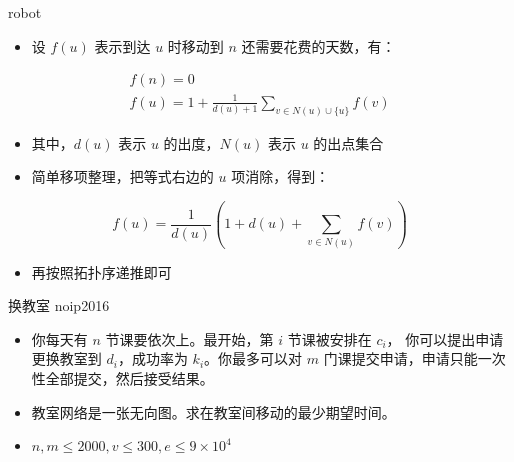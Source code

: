 \documentclass{beamer}
\begin{document}
    \begin{frame}{robot}
        \begin{itemize}
            \setlength{\itemsep}{10pt}
            \item 设 $f(u)$ 表示到达 $u$ 时移动到 $n$ 还需要花费的天数，有：
        \end{itemize}
        \begin{gather*}
            f(n)=0 \\
            f(u) = 1+\frac{1}{d(u)+1} \sum_{v\in N(u) \cup \{u\}}f(v)
        \end{gather*}
        \begin{itemize}
            \setlength{\itemsep}{10pt}
            \item 其中，$d(u)$ 表示 $u$ 的出度，$N(u)$ 表示 $u$ 的出点集合
            \item 简单移项整理，把等式右边的 $u$ 项消除，得到：
        \end{itemize}
        $$
            f(u)=\frac{1}{d(u)}\left(1+d(u)+\sum_{v\in N(u)}f(v)\right)
        $$
        \begin{itemize}
            \setlength{\itemsep}{10pt}
            \item 再按照拓扑序递推即可
        \end{itemize}
    \end{frame}

    \begin{frame}{换教室}
        {noip2016}
        \begin{itemize}
            \setlength{\itemsep}{10pt}
            \item 你每天有 $n$ 节课要依次上。最开始，第 $i$ 节课被安排在 $c_i$，
            你可以提出申请更换教室到 $d_i$，成功率为 $k_i$。你最多可以对 
            $m$ 门课提交申请，申请只能一次性全部提交，然后接受结果。
            \item 教室网络是一张无向图。求在教室间移动的最少期望时间。
            \item $n,m\le 2000,v\le 300,e\le 9\times 10^4$
        \end{itemize}
    \end{frame}
\end{document}
